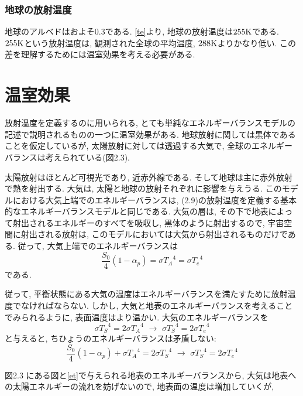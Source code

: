 \documentclass[a4j,12pt,openbib,oneside,dvipdfmx]{jbook}
\begin{document}
\subsubsection{地球の放射温度}
地球のアルベドはおよそ$0.3$である. \eqref{te}より, 地球の放射温度は$255 \rm{K}$である. $255 \rm{K}$という放射温度は, 観測された全球の平均温度, $288 \rm{K}$よりかなり低い. この差を理解するためには温室効果を考える必要がある.

\newpage
{}
\section{温室効果}
放射温度を定義するのに用いられる, とても単純なエネルギーバランスモデルの記述で説明されるものの一つに温室効果がある. 地球放射に関しては黒体であることを仮定しているが, 太陽放射に対しては透過する大気で, 全球のエネルギーバランスは考えられている(図2.3).
\par
太陽放射はほとんど可視光であり, 近赤外線である. そして地球は主に赤外放射で熱を射出する. 大気は, 太陽と地球の放射それぞれに影響を与えうる. 
このモデルにおける大気上端でのエネルギーバランスは, (2.9)の放射温度を定義する基本的なエネルギーバランスモデルと同じである. 大気の層は, その下で地表によって射出されるエネルギーのすべてを吸収し, 黒体のように射出するので, 宇宙空間に射出される放射は, このモデルにおいては大気から射出されるものだけである. 
従って, 大気上端でのエネルギーバランスは
\begin{equation}
 \frac{S_0}{4}(1-\alpha_p)=\sigma{T_A}^4=\sigma{T_e}^4 
\end{equation}
である.
\par
従って, 平衡状態にある大気の温度はエネルギーバランスを満たすために放射温度でなければならない. 
しかし, 大気と地表のエネルギーバランスを考えることでみられるように, 表面温度はより温かい. 大気のエネルギーバランスを
\begin{equation}
  \sigma{T_S}^4=2\sigma{T_A}^4\,\,\to\,\,\sigma{T_S}^4=2\sigma{T_e}^4
\end{equation}
と与えると, ちひょうのエネルギーバランスは矛盾しない:
\begin{equation}
  \frac{S_0}{4}(1-\alpha_p)+\sigma{T_A}^4=2\sigma{T_S}^4\,\,\to\,\,\sigma{T_S}^4=2\sigma{T_e}^4 \label{et}
\end{equation}
\par
図2.3 にある図と\eqref{et}で与えられる地表のエネルギーバランスから, 大気は地表への太陽エネルギーの流れを妨げないので, 地表面の温度は増加していくが,

\newpage
{}
\end{document}
